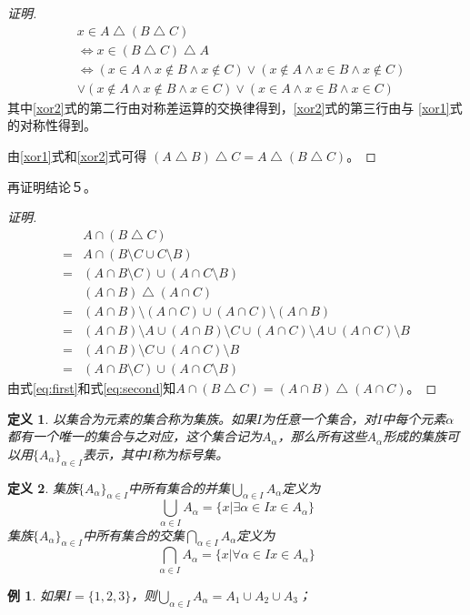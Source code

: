 \documentclass{book}[oneside]
\newtheorem{Def}{定义}[chapter]
\newtheorem*{Example}{例}
\begin{document}
\begin{CJK*}{UTF8}{gbsn}
\begin{proof}[证明]
  \begin{equation}\label{xor2}
    \begin{split}
      &x \in A \bigtriangleup (B \bigtriangleup C)\\
      &\Leftrightarrow x \in (B \bigtriangleup C) \bigtriangleup A\\
      &\Leftrightarrow (x \in A \land x \notin B \land x \notin C) \lor (x \notin A \land x \in B \land x \notin C)\\
      &\lor (x \notin A \land x \notin B \land x \in C) \lor (x \in A \land x \in B \land x \in C)
    \end{split}
  \end{equation}
  其中\eqref{xor2}式的第二行由对称差运算的交换律得到，\eqref{xor2}式的第三行由与
   \eqref{xor1}式的对称性得到。

  由\eqref{xor1}式和\eqref{xor2}式可得
  $(A\bigtriangleup B)\bigtriangleup C = A\bigtriangleup (B\bigtriangleup C)$。
\end{proof}

再证明结论５。

\begin{proof}[证明]
   \begin{align}
    &A\cap (B\bigtriangleup C)\nonumber \\
    =&A\cap (B\setminus C \cup C\setminus B) \nonumber \\
    =&(A\cap B\setminus C) \cup (A \cap C\setminus B) \label{eq:first} \\      
    &(A\cap B)\bigtriangleup (A\cap C) \nonumber \\
    =&(A\cap B)\setminus (A\cap C) \cup (A\cap C)\setminus (A\cap B) \nonumber \\
    =&(A\cap B)\setminus A \cup (A\cap B)\setminus C \cup (A\cap C)\setminus A \cup (A\cap C)\setminus B \nonumber \\
    =&(A\cap B)\setminus C \cup (A\cap C)\setminus B \nonumber \\
    =&(A\cap B\setminus C) \cup (A \cap C\setminus B)\label{eq:second}      
   \end{align}
由式\eqref{eq:first}和式\eqref{eq:second}知$A\cap (B\bigtriangleup C)=(A\cap B)\bigtriangleup (A\cap C)$。
\end{proof}
  \begin{Def}  
    以集合为元素的集合称为集族。如果$I$为任意一个集合，对$I$中每个元素$\alpha$都有一个唯一的集合与之对应，这个集合记为$A_{\alpha}$，那么所有这些$A_{\alpha}$形成的集族可以用$\{A_{\alpha}\}_{\alpha \in I}$表示，其中$I$称为标号集。
  \end{Def}
  \begin{Def}
    集族$\{A_{\alpha}\}_{\alpha \in I}$中所有集合的并集$\bigcup_{\alpha \in I}A_{\alpha}$定义为
\[ \bigcup_{\alpha \in I}A_{\alpha} = \{x|\exists \alpha \in I  x \in A_{\alpha}\}\]
    集族$\{A_{\alpha}\}_{\alpha \in I}$中所有集合的交集$\bigcap_{\alpha \in I}A_{\alpha}$定义为
\[ \bigcap_{\alpha \in I}A_{\alpha} = \{x|\forall \alpha \in I x \in A_{\alpha}\}\]
  \end{Def}
\begin{Example}
  如果$I=\{1,2,3\}$，则$\bigcup_{\alpha \in I}A_{\alpha} =A_1\cup A_2\cup A_3$；


\end{Example}
\end{CJK*}
\end{document}
